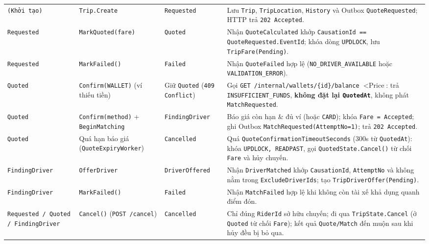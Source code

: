 \documentclass[12pt,a4paper]{article}
\newcommand{\ab}{\allowbreak}
\begin{document}
{\begin{longtable}{L{2.6cm} L{2.8cm} L{2.8cm} L{6.4cm}}
\texttt{(Khởi tạo)} & \texttt{Trip.Create} & \texttt{Requested} & Lưu \texttt{Trip}, \texttt{TripLocation}, \texttt{History} và Outbox \texttt{QuoteRequested}; HTTP trả \texttt{202 Accepted}. \\
\texttt{Requested} & \texttt{MarkQuoted(fare)} & \texttt{Quoted} & Nhận \texttt{QuoteCalculated} khớp \texttt{CausationId == QuoteRequested.EventId}; khóa dòng \texttt{UPDLOCK}, lưu \texttt{TripFare(Pending)}. \\
\texttt{Requested} & \texttt{MarkFailed()} & \texttt{Failed} & Nhận \texttt{QuoteFailed} hợp lệ (\texttt{NO\_DRIVER\_AVAILABLE} hoặc \texttt{VALIDATION\_ERROR}). \\
\texttt{Quoted} & \texttt{Confirm(WALLET)} \newline (ví thiếu tiền) & Giữ \texttt{Quoted} \newline (\texttt{409 Conflict}) & Gọi \texttt{GET /internal/\ab wallets/\{id\}/\ab balance} $< \text{Price}$: trả \texttt{INSUFFICIENT\_FUNDS}, \textbf{không đặt lại \texttt{QuotedAt}}, không phát \texttt{MatchRequested}. \\
\texttt{Quoted} & \texttt{Confirm(method)} + \texttt{BeginMatching} & \texttt{FindingDriver} & Báo giá còn hạn \& đủ ví (hoặc \texttt{CARD}); khóa \texttt{Fare = Accepted}; ghi Outbox \texttt{MatchRequested(\ab AttemptNo=1)}; trả \texttt{202 Accepted}. \\
\texttt{Quoted} & Quá hạn báo giá \newline (\texttt{QuoteExpiryWorker}) & \texttt{Cancelled} & Quá \texttt{QuoteConfirmation\ab TimeoutSeconds} (300s từ \texttt{QuotedAt}): khóa \texttt{UPDLOCK, READPAST}, gọi \texttt{QuotedState.Cancel()} từ chối \texttt{Fare} và hủy chuyến. \\
\texttt{FindingDriver} & \texttt{OfferDriver} & \texttt{DriverOffered} & Nhận \texttt{DriverMatched} khớp \texttt{CausationId}, \texttt{AttemptNo} và không nằm trong \texttt{ExcludeDriverIds}; tạo \texttt{TripDriverOffer(Pending)}. \\
\texttt{FindingDriver} & \texttt{MarkFailed()} & \texttt{Failed} & Nhận \texttt{MatchFailed} hợp lệ khi không còn tài xế khả dụng quanh điểm đón. \\
\texttt{Requested / Quoted / FindingDriver} & \texttt{Cancel()} \newline (\texttt{POST /cancel}) & \texttt{Cancelled} & Chỉ đúng \texttt{RiderId} sở hữu chuyến; đi qua \texttt{TripState.Cancel} (ở \texttt{Quoted} từ chối \texttt{Fare}); kết quả \texttt{Quote/\ab Match} đến muộn sau khi hủy đều bị bỏ qua. \\

\end{longtable}}
\end{document}
